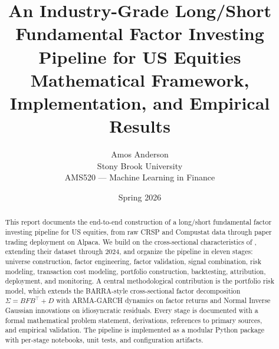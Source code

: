 \documentclass[11pt,letterpaper]{report}
\title{
  \vspace{-1cm}
  \textbf{An Industry-Grade Long/Short Fundamental Factor Investing Pipeline for US Equities} \\[0.5em]
  \large Mathematical Framework, Implementation, and Empirical Results
}
\author{
  Amos Anderson \\
  \small Stony Brook University \\
  \small AMS520 --- Machine Learning in Finance
}
\date{Spring 2026}
\newcommand{\T}{^{\top}}
\begin{document}
\maketitle

\begin{abstract}
\noindent
This report documents the end-to-end construction of a long/short fundamental
factor investing pipeline for US equities, from raw CRSP and Compustat data
through paper trading deployment on Alpaca. We build on the cross-sectional
characteristics of \citet{chen2024deep}, extending their dataset through 2024,
and organize the pipeline in eleven stages: universe construction, factor
engineering, factor validation, signal combination, risk modeling, transaction
cost modeling, portfolio construction, backtesting, attribution, deployment,
and monitoring. A central methodological contribution is the portfolio risk
model, which extends the BARRA-style cross-sectional factor decomposition
$\Sigma = BFB\T + D$ with ARMA-GARCH dynamics on factor returns and Normal
Inverse Gaussian innovations on idiosyncratic residuals. Every stage is
documented with a formal mathematical problem statement, derivations,
references to primary sources, and empirical validation. The pipeline is
implemented as a modular Python package with per-stage notebooks, unit tests,
and configuration artifacts.
\end{abstract}

\tableofcontents
\clearpage


















\appendix


\end{document}
